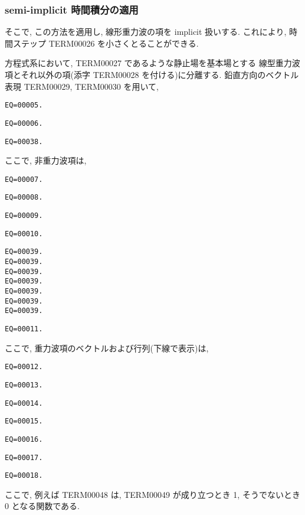 \subsubsection{semi-implicit 時間積分の適用}

そこで, この方法を適用し, 線形重力波の項を implicit 扱いする.
これにより, 時間ステップ TERM00026 を小さくとることができる.

方程式系において, TERM00027 であるような静止場を基本場とする
線型重力波項とそれ以外の項(添字 TERM00028 を付ける)に分離する.
鉛直方向のベクトル表現
TERM00029, TERM00030 を用いて,
%
\begin{verbatim}
EQ=00005.
\end{verbatim}
%
\begin{verbatim}
EQ=00006.
\end{verbatim}
%
\begin{verbatim}
EQ=00038.
\end{verbatim}

ここで, 非重力波項は,
%
\begin{verbatim}
EQ=00007.
\end{verbatim}
%
\begin{verbatim}
EQ=00008.
\end{verbatim}
%
\begin{verbatim}
EQ=00009.
\end{verbatim}
%
\begin{verbatim}
EQ=00010.
\end{verbatim}
%
\begin{verbatim}
EQ=00039.
EQ=00039.
EQ=00039.
EQ=00039.
EQ=00039.
EQ=00039.
EQ=00039.
\end{verbatim}
\begin{verbatim}
EQ=00011.
\end{verbatim}

ここで, 重力波項のベクトルおよび行列(下線で表示)は,
%
\begin{verbatim}
EQ=00012.
\end{verbatim}
%
\begin{verbatim}
EQ=00013.
\end{verbatim}
%
\begin{verbatim}
EQ=00014.
\end{verbatim}
%
\begin{verbatim}
EQ=00015.
\end{verbatim}
%
\begin{verbatim}
EQ=00016.
\end{verbatim}
%
\begin{verbatim}
EQ=00017.
\end{verbatim}
%
\begin{verbatim}
EQ=00018.
\end{verbatim}
%
ここで, 例えば TERM00048 は,
TERM00049 が成り立つとき 1, そうでないとき 0 となる関数である.

